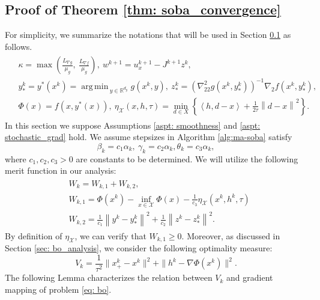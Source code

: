 \documentclass[10pt]{article}
\theoremstyle{remark}
\newcommand{\cX}{\mathcal{X}}
\newcommand{\realset}{\mathbb{R}}
\newcommand{\norm}[1]{\left\|#1\right\|}
\DeclareMathOperator*{\argmin}{arg\,min\,}
\def\<#1,#2>{\left\langle #1,#2\right\rangle}
\begin{document}
\subsection{Proof of Theorem \ref{thm: soba_convergence}}\label{sec: thm1proof}
For simplicity, we summarize the notations that will be used in Section \ref{sec: thm1proof} as follows. 
\begin{align}\label{append: notations_simple}
    \begin{aligned}
        &\kappa = \max\left(\frac{L_{\nabla g}}{\mu_g},\ \frac{L_{\nabla f}}{\mu_g}\right),\ w^{k+1} =u_x^{k+1} - J^{k+1}z^k, \\
        &y_{*}^k = y^*(x^k) = \argmin_{y\in \realset^{d_y}} g(x^k, y),\ z_{*}^k  =  \left(\nabla_{22}^2g(x^k, y_{*}^k)\right)^{-1}\nabla_2f(x^k, y_{*}^k), \\
        &\Phi(x) = f(x, y^*(x)),\ \eta_{\cX}(x, h, \tau) = \min_{d\in X}\left\{\<h, d - x> + \frac{1}{2\tau}\norm{d-x}^2\right\}.
    \end{aligned}
\end{align}
In this section we suppose Assumptions \ref{aspt: smoothness} and \ref{aspt: stochastic_grad} hold.
We assume stepsizes in Algorithm \ref{alg:ma-soba} satisfy
\begin{equation}\label{eq: stepsize_ratio_simple}
    \beta_k = c_1\alpha_k,\ \gamma_k = c_2\alpha_k, \theta_k = c_3\alpha_k,
\end{equation}
where $c_1, c_2, c_3 > 0$ are constants to be determined. We will utilize the following merit function in our analysis:
\begin{align}\label{eq: merit_W}
    \begin{aligned}
        &W_k = W_{k,1} + W_{k,2},\\
        & W_{k,1} = \Phi(x^k) -\inf_{x\in\cX} \Phi(x) - \frac{1}{c_3}\eta_{\cX}(x^k,h^k,\tau) \\
        &W_{k,2} = \frac{1}{c_1}\norm{y^k - y_*^k}^2 + \frac{1}{c_2}\norm{z^k - z_*^k}^2.
    \end{aligned}
\end{align}
By definition of $\eta_{\cX}$, we can verify that $W_{k,1}\geq 0$. Moreover, as discussed in Section \ref{sec: bo_analysis}, we consider the following optimality measure:
\begin{equation}\label{eq: V_k_masoba}
    V_k = \frac{1}{\tau^2}\|x_+^k - x^k\|^2 + \|h^k - \nabla \Phi(x^k)\|^2.
\end{equation}
The following Lemma characterizes the relation between $V_k$ and gradient mapping of problem \ref{eq: bo}.
\end{document}
